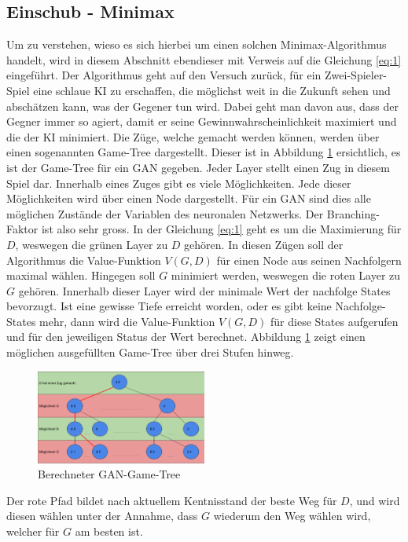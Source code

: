\subsection{Einschub - Minimax}
Um zu verstehen, wieso es sich hierbei um einen solchen Minimax-Algorithmus handelt, wird in diesem Abschnitt ebendieser mit
Verweis auf die Gleichung \ref{eq:1} eingeführt. Der Algorithmus geht auf den Versuch zurück, für ein Zwei-Spieler-Spiel eine
schlaue KI zu erschaffen, die möglichst weit in die Zukunft sehen und abschätzen kann, was der Gegener tun wird.
Dabei geht man davon aus, dass der Gegner immer so agiert, damit er seine Gewinnwahrscheinlichkeit maximiert und die
der KI minimiert.\cite{towardsdatascience:minimax} Die Züge, welche gemacht werden können, werden über einen sogenannten
Game-Tree dargestellt. Dieser ist in Abbildung \ref{fig:Berechneter GAN-Game-Tree} ersichtlich,
es ist der Game-Tree für ein \Gls{GAN} gegeben. Jeder Layer stellt einen Zug in diesem Spiel dar.
Innerhalb eines Zuges gibt es viele Möglichkeiten. Jede dieser Möglichkeiten wird über einen Node dargestellt.
Für ein \Gls{GAN} sind dies alle möglichen Zustände der Variablen des neuronalen Netzwerks. Der Branching-Faktor ist also
sehr gross. In der Gleichung \ref{eq:1} geht es um die Maximierung für $D$, weswegen die grünen Layer zu $D$ gehören. In diesen Zügen
soll der Algorithmus die Value-Funktion $V(G,D)$ für einen Node aus seinen Nachfolgern maximal wählen. Hingegen soll $G$ minimiert werden, weswegen
die roten Layer zu $G$ gehören. Innerhalb dieser Layer wird der minimale Wert der nachfolge States bevorzugt. Ist eine gewisse
Tiefe erreicht worden, oder es gibt keine Nachfolge-States mehr, dann wird die Value-Funktion $V(G,D)$ für diese States aufgerufen und für den
jeweiligen Status der Wert berechnet. Abbildung \ref{fig:Berechneter GAN-Game-Tree} zeigt einen möglichen ausgefüllten Game-Tree über drei Stufen hinweg.
\begin{figure}[h!]
    \begin{center}
        \includegraphics[width=0.5\textwidth]{../common/02_main/resources/04_gan_game_tree_filled.png}
    \end{center}
    \caption{Berechneter GAN-Game-Tree}
    \label{fig:Berechneter GAN-Game-Tree}
\end{figure}
Der rote Pfad bildet nach aktuellem Kentnisstand der beste Weg für $D$, und wird diesen wählen unter der Annahme,
dass $G$ wiederum den Weg wählen wird, welcher für $G$ am besten ist.
\newpage
